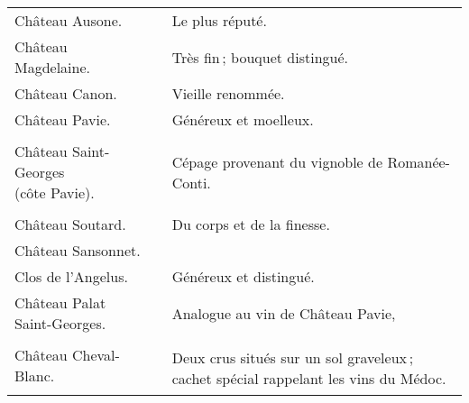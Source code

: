 \scriptsize
\begin{longtable}{m{14em}m{8em}m{14em}}                                                   
  Château Ausone.                     &                 & Le plus réputé.                                              \\
  Château Magdelaine.                 &                 & Très fin ; bouquet distingué.                                \\
  Château Canon.                      &                 & Vieille renommée.                                            \\
  Château Pavie.                      &                 & Généreux et moelleux.                                        \\
                                      &                 &                                                              \\
  \makecell[l]{Château Saint-Georges \\ 
  \hspace{1em}(côte Pavie).}          &                 & Cépage provenant du vignoble de Romanée-Conti.               \\
                                      &                 &                                                              \\
  Château Soutard.                    &                 & Du corps et de la finesse.                                   \\
  Château Sansonnet.                  &                 &                                                              \\
  Clos de l'Angelus.                  &                 & Généreux et distingué.                                       \\
  Château Palat Saint-Georges.        &                 & Analogue au vin de Château Pavie,                            \\
                                      &                 &                                                              \\
  Château Cheval-Blanc.               &                 & \multirow{2}{10em}{Deux crus situés sur un sol 
                                                          graveleux ; cachet spécial rappelant les vins 
                                                          du Médoc.}                                                   \\
                                      &                 &                                                              \\

\end{longtable}

